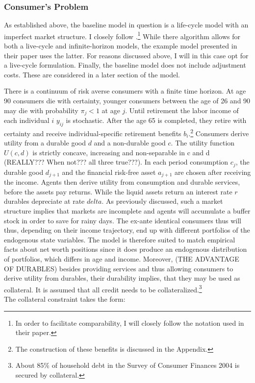 \documentclass[a4paper,12pt]{article}
\begin{document}
\subsubsection{Consumer's Problem}
As established above, the baseline model in question is a life-cycle model with an imperfect market structure. I closely follow \cite{hintermaier2010}.\footnote{In order to facilitate comparability, I will closely follow the notation used in their paper.} While there algorithm allows for both a live-cycle and infinite-horizon models, the example model presented in their paper uses the latter. For reasons discussed above, I will in this case opt for a live-cycle formulation. Finally, the baseline model does not include adjustment costs. These are considered in a later section of the model. 

There is a continuum of risk averse consumers with a finite time horizon. 
At age 90 consumers die with certainty, younger consumers between the age of 26 and 90 may die with probability $\pi_{j} < 1$ at age $j$. Until retirement the labor income of each individual $i$ $y_{ij}$ is stochastic. After the age 65 is completed, they retire with certainty and receive individual-specific retirement benefits $b_{i}$.\footnote{The construction of these benefits is discussed in the Appendix.}
Consumers derive utility from a durable good $d$ and a non-durable good $c$. The utility function $U(c,d)$ is strictly concave, increasing and non-separable in c and d (REALLY??? When not??? all three true???). 
In each period consumption $c_{j}$, the durable good $d_{j+1}$ and the financial risk-free asset $a_{j+1}$ are chosen after receiving the income. Agents then derive utility from consumption and durable services, before the assets pay returns. While the liquid assets return an interest rate $r$ durables depreciate at rate $delta$. As previously discussed, such a market structure implies that markets are incomplete and agents will accumulate a buffer stock in order to save for rainy days. The ex-ante identical consumers thus will thus, depending on their income trajectory, end up with different portfolios of the endogenous state variables. The model is therefore suited to match empirical facts about net worth positions since it does produce an endogenous distribution of portfolios, which differs in age and income. Moreover, (THE ADVANTAGE OF DURABLES) besides providing services and thus allowing consumers to derive utility from durables, their durability implies, that they may be used as collateral. It is assumed that all credit needs to be collateralized.\footnote{About 85\% of household debt in the Survey of Consumer Finances 2004 is secured by collateral.\citep{hintermaier2010}} 
\\
The collateral constraint takes the form:
\end{document}
